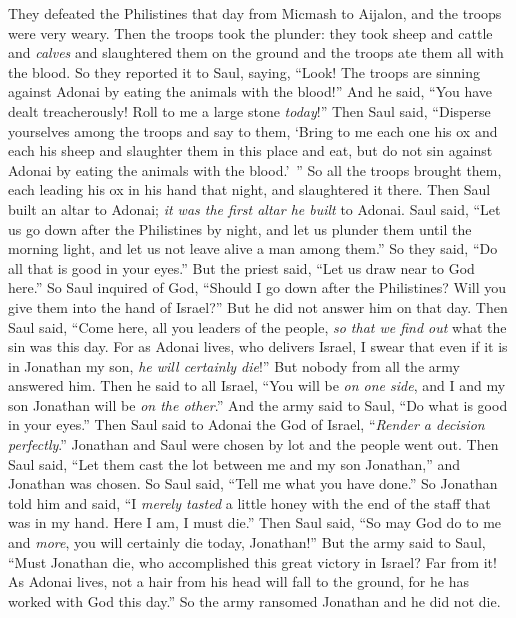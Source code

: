 \begin{biblechapter}
\verse They defeated the Philistines that day from Micmash to Aijalon, and the troops were very weary.
\verse Then the troops took the plunder: they took sheep and cattle and \textit{calves} and slaughtered them on the ground and the troops ate them all with the blood.
\verse So they reported it to Saul, saying, “Look! The troops are sinning against Adonai by eating the animals with the blood!” And he said, “You have dealt treacherously! Roll to me a large stone \textit{today}!”
\verse Then Saul said, “Disperse yourselves among the troops and say to them, ‘Bring to me each one his ox and each his sheep and slaughter them in this place and eat, but do not sin against Adonai by eating the animals with the blood.’ ” So all the troops brought them, each leading his ox in his hand that night, and slaughtered it there.
 Then Saul built an altar to Adonai; \textit{it was the first altar he built} to Adonai.
\verse Saul said, “Let us go down after the Philistines by night, and let us plunder them until the morning light, and let us not leave alive a man among them.” So they said, “Do all that is good in your eyes.” But the priest said, “Let us draw near to God here.”
\verse So Saul inquired of God, “Should I go down after the Philistines? Will you give them into the hand of Israel?” But he did not answer him on that day.
\verse Then Saul said, “Come here, all you leaders of the people, \textit{so that we find out} what the sin was this day.
\verse For as Adonai lives, who delivers Israel, I swear that even if it is in Jonathan my son, \textit{he will certainly die}!” But nobody from all the army answered him.
\verse Then he said to all Israel, “You will be \textit{on one side}, and I and my son Jonathan will be \textit{on the other}.” And the army said to Saul, “Do what is good in your eyes.”
\verse Then Saul said to Adonai the God of Israel, “\textit{Render a decision perfectly}.” Jonathan and Saul were chosen by lot and the people went out.
\verse Then Saul said, “Let them cast the lot between me and my son Jonathan,” and Jonathan was chosen.
\verse So Saul said, “Tell me what you have done.” So Jonathan told him and said, “I \textit{merely tasted} a little honey with the end of the staff that was in my hand. Here I am, I must die.”
\verse Then Saul said, “So may God do to me and \textit{more}, you will certainly die today, Jonathan!”
\verse But the army said to Saul, “Must Jonathan die, who accomplished this great victory in Israel? Far from it! As Adonai lives, not a hair from his head will fall to the ground, for he has worked with God this day.” So the army ransomed Jonathan and he did not die.

\end{biblechapter}
